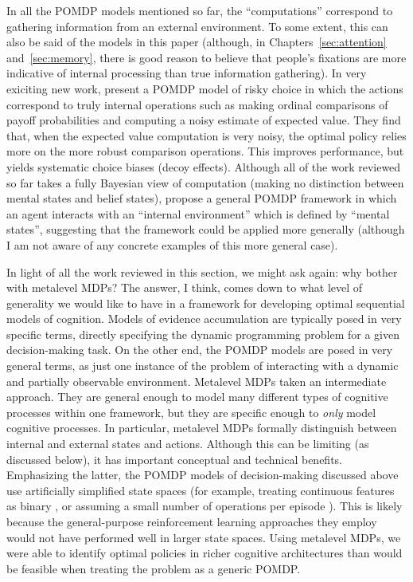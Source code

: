 In all the POMDP models mentioned so far, the ``computations'' correspond to gathering information from an external environment. To some extent, this can also be said of the models in this paper (although, in Chapters~\ref{sec:attention} and~\ref{sec:memory}, there is good reason to believe that people's fixations are more indicative of internal processing than true information gathering). In very exiciting new work, \citet{chen2021apparently} present a POMDP model of risky choice in which the actions correspond to truly internal operations such as making ordinal comparisons of payoff probabilities and computing a noisy estimate of expected value. They find that, when the expected value computation is very noisy, the optimal policy relies more on the more robust comparison operations. This improves performance, but yields systematic choice biases (decoy effects). Although all of the work reviewed so far takes a fully Bayesian view of computation (making no distinction between mental states and belief states), \citet{oulasvirta2022computational} propose a general POMDP framework in which an agent interacts with an ``internal environment'' which is defined by ``mental states'', suggesting that the framework could be applied more generally (although I am not aware of any concrete examples of this more general case).

In light of all the work reviewed in this section, we might ask again: why bother with metalevel MDPs? The answer, I think, comes down to what level of generality we would like to have in a framework for developing optimal sequential models of cognition. Models of evidence accumulation are typically posed in very specific terms, directly specifying the dynamic programming problem for a given decision-making task. On the other end, the POMDP models are posed in very general terms, as just one instance of the problem of interacting with a dynamic and partially observable environment. Metalevel MDPs taken an intermediate approach. They are general enough to model many different types of cognitive processes within one framework, but they are specific enough to \emph{only} model cognitive processes. In particular, metalevel MDPs formally distinguish between internal and external states and actions. Although this can be limiting (as discussed below), it has important conceptual and technical benefits. Emphasizing the latter, the POMDP models of decision-making discussed above use artificially simplified state spaces (for example, treating continuous features as binary \citealp{chen2017cognitive}, or assuming a small number of operations per episode \citealp{chen2021apparently}). This is likely because the general-purpose reinforcement learning approaches they employ would not have performed well in larger state spaces. Using metalevel MDPs, we were able to identify optimal policies in richer cognitive architectures than would be feasible when treating the problem as a generic POMDP.

